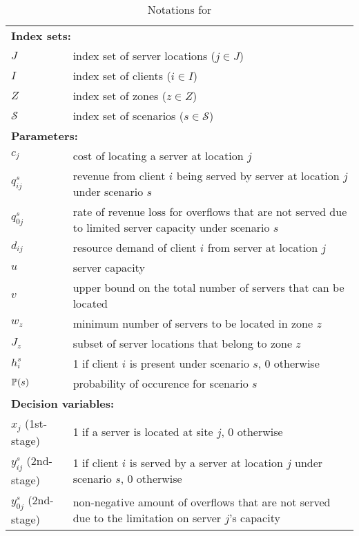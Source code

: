 \begin{table}[H]
	\caption{Notations for \sslp}
	\label{sslp:notation}
	\resizebox{\textwidth}{!}
	{
		\begin{tabular}{ll}
			\toprule
			\multicolumn{2}{l}{\textbf{Index sets:}} \\
			$J$ 		  & index set of server locations ($j\in J$)\\ 
			$I$ 		  & index set of clients ($i\in I$)  \\ 
			$Z$ 		  & index set of zones ($z\in Z$) \\
			$\mathcal{S}$ & index set of scenarios ($s\in \mathcal{S}$)	\\ \midrule
			\multicolumn{2}{l}{\textbf{Parameters:}} \\
			$c_j$		& cost of locating a server at location $j$	\\
			$q_{ij}^s$	& revenue from client $i$ being served by server at location $j$ under scenario $s$	\\
			$q_{0j}^s$	& rate of revenue loss for overflows that are not served due to limited server capacity under scenario $s$	\\
			$d_{ij}$	& resource demand of client $i$ from server at location $j$	\\
			$u$			& server capacity	\\
			$v$			& upper bound on the total number of servers that can be located	\\
			$w_z$		& minimum number of servers to be located in zone $z$	\\
			$J_z$		& subset of server locations that belong to zone $z$	\\
			$h_i^s$		& 1 if client $i$ is present under scenario $s$, 0 otherwise	\\
			$\operatorname*{\mathbb{P}}(s)$ 	& probability of occurence for scenario $s$\\ \midrule
			\multicolumn{2}{l}{\textbf{Decision variables:}} \\
			$x_j$ (1st-stage)  	 & 1 if a server is located at site $j$, 0 otherwise \\
			$y_{ij}^s$ (2nd-stage) & 1 if client $i$ is served by a server at location $j$ under scenario $s$, 0 otherwise\\
			$y_{0j}^s$ (2nd-stage) & non-negative amount of overflows that are not served due to the limitation on server $j$'s capacity	\\
			\bottomrule
		\end{tabular}
	}
\end{table} 

